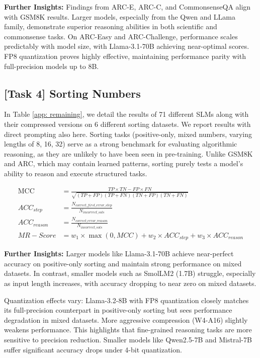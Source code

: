 \textbf{Further Insights:} Findings from ARC-E, ARC-C, and CommonsenseQA align with GSM8K results. Larger models, especially from the Qwen and LLama family, demonstrate superior reasoning abilities in both scientific and commonsense tasks. On ARC-Easy and ARC-Challenge, performance scales predictably with model size, with Llama-3.1-70B achieving near-optimal scores. FP8 quantization proves highly effective, maintaining performance parity with full-precision models up to 8B. 


\subsection{[Task 4] Sorting Numbers}
In Table \ref{app: remaining}, we detail the results of 71 different SLMs along with their compressed versions on 6 different sorting datasets. We report results with direct prompting also here. Sorting tasks (positive-only, mixed numbers, varying lengths of 8, 16, 32) serve as a strong benchmark for evaluating algorithmic reasoning, as they are unlikely to have been seen in pre-training. Unlike GSM8K and ARC, which may contain learned patterns, sorting purely tests a model’s ability to reason and execute structured tasks.\medskip


\begin{table*}[t]
    \centering
    \begin{align*}
    \text{MCC} &= \frac{TP \times TN - FP \times FN}{\sqrt{(TP + FP)(TP + FN)(TN + FP)(TN + FN)}} \\
    ACC_{step} &= \frac{N_{correct\_first\_error\_step}}{N_{incorrect\_sols}} \\
    ACC_{reason} &= \frac{N_{correct\_error\_reason}}{N_{incorrect\_sols}} \\
    MR-Score &= w_1 \times \max(0, MCC) + w_2 \times ACC_{step} + w_3 \times ACC_{reason}
    \end{align*}
\end{table*}

\textbf{Further Insights:} Larger models like Llama-3.1-70B achieve near-perfect accuracy on positive-only sorting and maintain strong performance on mixed datasets. In contrast, smaller models such as SmolLM2 (1.7B) struggle, especially as input length increases, with accuracy dropping to near zero on mixed datasets.\medskip

Quantization effects vary: Llama-3.2-8B with FP8 quantization closely matches its full-precision counterpart in positive-only sorting but sees performance degradation in mixed datasets. More aggressive compression (W4-A16) slightly weakens performance. This highlights that fine-grained reasoning tasks are more sensitive to precision reduction. Smaller models like Qwen2.5-7B and Mistral-7B suffer significant accuracy drops under 4-bit quantization.\medskip

